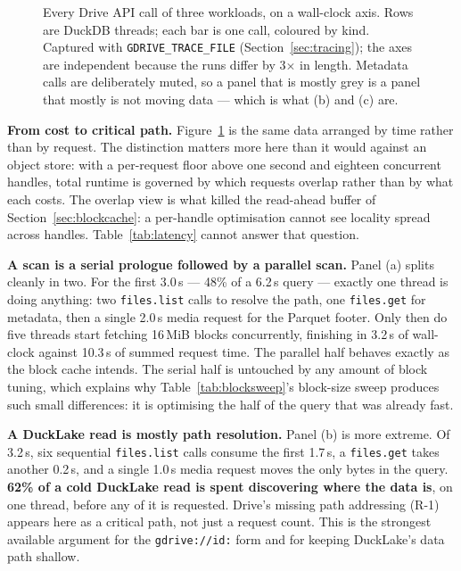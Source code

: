 \documentclass[sigconf, nonacm]{acmart}
\begin{document}
\begin{figure}[t]
\centering

\caption{Every Drive API call of three workloads, on a wall-clock axis. Rows
are DuckDB threads; each bar is one call, coloured by kind. Captured with
\texttt{GDRIVE\_TRACE\_FILE} (Section~\ref{sec:tracing}); the axes are
independent because the runs differ by 3$\times$ in length. Metadata calls are
deliberately muted, so a panel that is mostly grey is a panel that mostly is
not moving data --- which is what (b) and (c) are.}
\label{fig:flame}
\end{figure}

\textbf{From cost to critical path.}
Figure~\ref{fig:flame} is the same data arranged by time rather than by
request. The distinction matters more here than it would against an object
store: with a per-request floor above one second and eighteen concurrent
handles, total runtime is governed by which requests overlap rather than by
what each costs. The overlap view is what killed the read-ahead buffer of
Section~\ref{sec:blockcache}: a per-handle optimisation cannot see locality
spread across handles. Table~\ref{tab:latency} cannot answer that question.

\textbf{A scan is a serial prologue followed by a parallel scan.}
Panel (a) splits cleanly in two. For the first 3.0\,s --- 48\% of a 6.2\,s query
--- exactly one thread is doing anything: two \texttt{files.list} calls to
resolve the path, one \texttt{files.get} for metadata, then a single 2.0\,s
media request for the Parquet footer. Only then do five threads start fetching
16\,MiB blocks concurrently, finishing in 3.2\,s of wall-clock against 10.3\,s
of summed request time. The parallel half behaves exactly as the block cache
intends. The serial half is untouched by any amount of block tuning, which
explains why Table~\ref{tab:blocksweep}'s block-size sweep produces such small
differences: it is optimising the half of the query that was already fast.

\textbf{A DuckLake read is mostly path resolution.}
Panel (b) is more extreme. Of 3.2\,s, six sequential \texttt{files.list} calls
consume the first 1.7\,s, a \texttt{files.get} takes another 0.2\,s, and a
single 1.0\,s media request moves the only bytes in the query. \textbf{62\% of
a cold DuckLake read is spent discovering where the data is}, on one thread,
before any of it is requested. Drive's missing path addressing (R-1) appears
here as a critical path, not just a request count. This is the strongest
available argument for the \texttt{gdrive://id:} form and for keeping
DuckLake's data path shallow.
\end{document}
